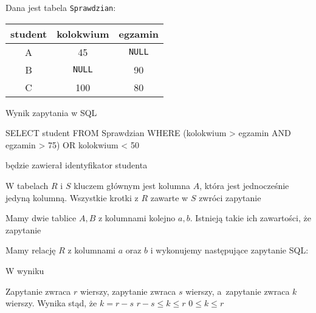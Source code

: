 \begin{problems}
    \prob Dana jest tabela \texttt{Sprawdzian}:
        \begin{center}
        \begin{tabular}{c|c|c}
        student & kolokwium & egzamin \\ \hline
        A & 45 & \texttt{NULL} \\
        B & \texttt{NULL} & 90 \\
        C & 100 & 80                         
        \end{tabular}
        \end{center}
    Wynik zapytania w SQL
    \begin{sql}
        SELECT student
        FROM Sprawdzian
        WHERE (kolokwium > egzamin AND egzamin > 75) OR kolokwium < 50
    \end{sql}
    będzie zawierał identyfikator studenta

    \prob W tabelach $R$ i $S$ kluczem głównym jest kolumna $A$, która jest jednocześnie jedyną kolumną. Wszystkie krotki z $R$ zawarte w $S$ zwróci zapytanie

    \prob Mamy dwie tablice $A, B$ z kolumnami kolejno $a, b$. Istnieją takie ich zawartości, że zapytanie
    \begin{center}
    \end{center}

    \prob Mamy relację $R$ z kolumnami $a$ oraz $b$ i wykonujemy następujące zapytanie SQL:
    \begin{center}
    \end{center}
    W wyniku
    
    \prob Zapytanie  zwraca $r$ wierszy, zapytanie  zwraca $s$ wierszy, a~zapytanie  zwraca $k$ wierszy. Wynika stąd, że
    \answers
    {$k = r - s$}
    {$r - s \leq k \leq r$}
    {$0 \leq k \leq r$}


\end{problems}
